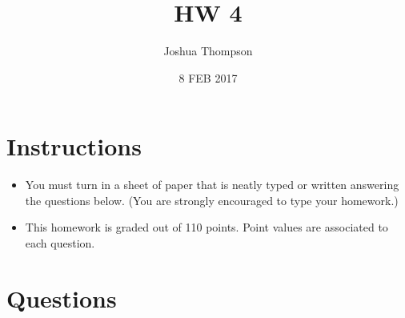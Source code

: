 \documentclass{article}[9pt]
\title{HW 4}
\author{Joshua Thompson}
\date{8 FEB 2017}
\begin{document}
\maketitle

\section*{Instructions}
\begin{itemize}

\item You must turn in a sheet of paper that is neatly typed or written answering the questions below. (You are strongly encouraged to type your homework.)

\item This homework is graded out of 110 points. Point values are associated to each question.

\end{itemize}
\section*{Questions}
\end{document}
